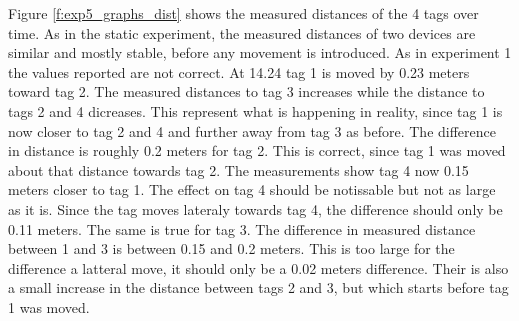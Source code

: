 Figure \ref{f:exp5_graphs_dist} shows the measured distances of the 4 tags over time.
As in the static experiment, the measured distances of two devices are similar and mostly stable, before any movement is introduced.
As in experiment 1 the values reported are not correct.
At 14.24 tag 1 is moved by 0.23 meters toward tag 2.
The measured distances to tag 3 increases while the distance to tags 2 and 4 dicreases.
This represent what is happening in reality, since tag 1 is now closer to tag 2 and 4 and further away from tag 3 as before.
The difference in distance is roughly 0.2 meters for tag 2.
This is correct, since tag 1 was moved about that distance towards tag 2.
The measurements show tag 4 now 0.15 meters closer to tag 1.
The effect on tag 4 should be notissable but not as large as it is.
Since the tag moves lateraly towards tag 4, the difference should only be 0.11 meters.
The same is true for tag 3.
The difference in measured distance between 1 and 3 is between 0.15 and 0.2 meters. 
This is too large for the difference a latteral move, it should only be a 0.02 meters difference.
Their is also a small increase in the distance between tags 2 and 3, but which starts before tag 1 was moved.


